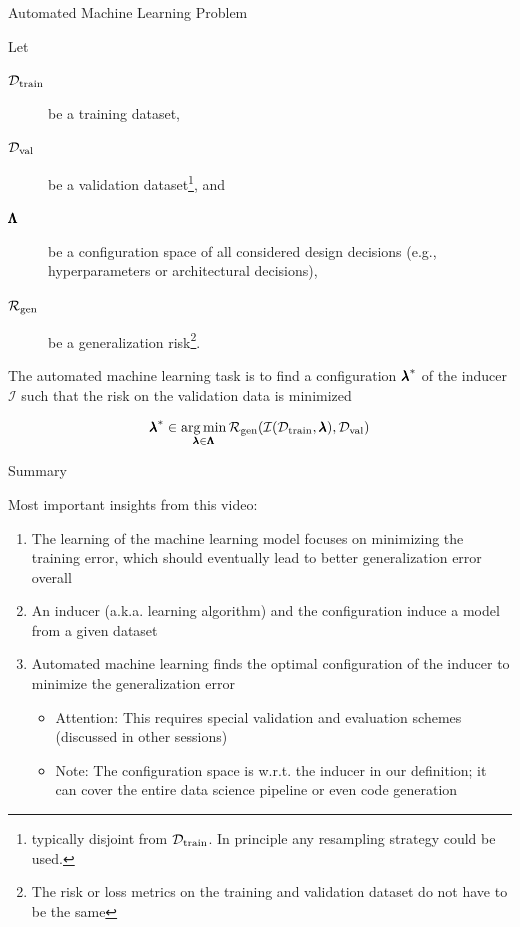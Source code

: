 \documentclass[main]{subfiles}
\begin{document}
\begin{frame}[c]{\alert{Automated} Machine Learning Problem}

Let  

\begin{description}
    \item[$\mathcal{D}_{\text{train}}$] be a training dataset,
    \item[$\mathcal{D}_{\text{val}}$] be a validation dataset\footnote{typically disjoint from $\mathcal{D}_{\text{train}}$. In principle any resampling strategy could be used.}, and
    \item[$\pmb{\Lambda}$] be a configuration space of all considered design decisions (e.g., hyperparameters or architectural decisions),
    \item[$\mathcal{R}_{\text{gen}}$] be a generalization risk\footnote{The risk or loss metrics on the training and validation dataset do not have to be the same}.
\end{description}

The automated machine learning task is to find a configuration ${\pmb{\lambda}}^*$ of the inducer $\mathcal{I}$ such that the risk on the validation data is minimized

$${\pmb{\lambda}}^* \in \operatorname*{arg\,min}_{\pmb{\lambda} \in \pmb{\Lambda}} \mathcal{R}_{\text{gen}}(\mathcal{I}(\mathcal{D}_{\text{train}}, \pmb{\lambda}), \mathcal{D}_{\text{val}})$$

\end{frame}
\begin{frame}{Summary} 

Most important insights from this video:

\begin{enumerate}
    \item The learning of the machine learning model focuses on minimizing the training error, which should eventually lead to better generalization error overall
    \item An inducer (a.k.a. learning algorithm) and the configuration induce a model from a given dataset
    \item Automated machine learning finds the optimal configuration of the inducer to minimize the generalization error
    \begin{itemize}
        \item \alert{Attention}: This requires special validation and evaluation schemes (discussed in other sessions)
        \item \alert{Note}: The configuration space is w.r.t. the inducer in our definition; it can cover the entire data science pipeline or even code generation
    \end{itemize}
\end{enumerate}

\end{frame}
\end{document}
